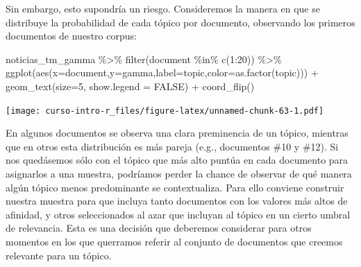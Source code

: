 \documentclass[
]{book}
\newenvironment{Shaded}{\begin{snugshade}}{\end{snugshade}}
\newcommand{\AttributeTok}[1]{\textcolor[rgb]{0.77,0.63,0.00}{#1}}
\newcommand{\ConstantTok}[1]{\textcolor[rgb]{0.00,0.00,0.00}{#1}}
\newcommand{\DecValTok}[1]{\textcolor[rgb]{0.00,0.00,0.81}{#1}}
\newcommand{\FunctionTok}[1]{\textcolor[rgb]{0.00,0.00,0.00}{#1}}
\newcommand{\NormalTok}[1]{#1}
\newcommand{\SpecialCharTok}[1]{\textcolor[rgb]{0.00,0.00,0.00}{#1}}
\begin{document}
Sin embargo, esto supondría un riesgo. Consideremos la manera en que se distribuye la probabilidad de cada tópico por documento, observando los primeros documentos de nuestro corpus:

\begin{Shaded}
\begin{Highlighting}[]
\NormalTok{noticias\_tm\_gamma }\SpecialCharTok{\%\textgreater{}\%} \FunctionTok{filter}\NormalTok{(document }\SpecialCharTok{\%in\%} \FunctionTok{c}\NormalTok{(}\DecValTok{1}\SpecialCharTok{:}\DecValTok{20}\NormalTok{)) }\SpecialCharTok{\%\textgreater{}\%}
  \FunctionTok{ggplot}\NormalTok{(}\FunctionTok{aes}\NormalTok{(}\AttributeTok{x=}\NormalTok{document,}\AttributeTok{y=}\NormalTok{gamma,}\AttributeTok{label=}\NormalTok{topic,}\AttributeTok{color=}\FunctionTok{as.factor}\NormalTok{(topic))) }\SpecialCharTok{+}
  \FunctionTok{geom\_text}\NormalTok{(}\AttributeTok{size=}\DecValTok{5}\NormalTok{, }\AttributeTok{show.legend =} \ConstantTok{FALSE}\NormalTok{) }\SpecialCharTok{+}
  \FunctionTok{coord\_flip}\NormalTok{()}
\end{Highlighting}
\end{Shaded}

\texttt{[image: curso-intro-r\_files/figure-latex/unnamed-chunk-63-1.pdf]}

En algunos documentos se observa una clara preminencia de un tópico, mientras que en otros esta distribución es más pareja (e.g., documentos \#10 y \#12). Si nos quedásemos sólo con el tópico que más alto puntúa en cada documento para asignarlos a una muestra, podríamos perder la chance de observar de qué manera algún tópico menos predominante se contextualiza. Para ello conviene construir nuestra muestra para que incluya tanto documentos con los valores más altos de afinidad, y otros seleccionados al azar que incluyan al tópico en un cierto umbral de relevancia. Esta es una decisión que deberemos considerar para otros momentos en los que querramos referir al conjunto de documentos que creemos relevante para un tópico.
\end{document}
